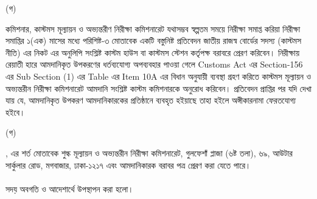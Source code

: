 \documentclass[12pt]{article}
\begin{document}
\begin{minipage}[t]{0.05\linewidth}
\hspace{1em}
\end{minipage}
\begin{minipage}[t]{0.05\linewidth}
(গ)
\end{minipage}
\begin{minipage}[t]{0.90\linewidth}
কমিশনার, কাস্টমস মূল্যায়ন ও অভ্যন্তরীণ
নিরীক্ষা কমিশনারেট যথাসম্ভব স্বল্পতম সময়ে
নিরীক্ষা সমাপ্ত করিয়া নিরীক্ষা সমাপ্তির
১(এক) মাসের মধ্যে পরিশিষ্ট-৩ মোতাবেক একটি
বস্তুনিষ্ট প্রতিবেদন জাতীয় রাজস্ব বোর্ডের
সদস্য (কাস্টমস নীতি) এর নিকট এর অনুলিপি সংশ্লিষ্ট
কাস্টম হাউস বা কাস্টমস স্টেশন কর্তৃপক্ষ
বরাবরে প্রেরণ করিবেন।
নিরীক্ষায় রেয়াতী হারে আমদানিকৃত উপকরণের
ধর্তব্যযোগ্য অপব্যবহার পাওয়া গেলে
Customs Act এর Section-156
এর Sub Section (1) এর Table এর Item 10A
এর বিধান অনুযায়ী ব্যবস্থা গ্রহণ করিতে কাস্টমস
মূল্যায়ন ও অভ্যন্তরীন নিরীক্ষা কমিশনারেট আমদানি
সংশ্লিষ্ট কাস্টম কমিশনারকে অনুরোধ করিবেন।
প্রতিবেদন প্রাপ্তির পর যদি দেখা যায় যে, আমদানিকৃত
উপকরণ আমদানিকারকের প্রতিষ্ঠানে ব্যবহৃত হইয়াছে তাহা
হইলে অঙ্গীকারনামা ফেরতযোগ্য হইবে।
\\
\end{minipage}
\begin{minipage}[t]{0.05\linewidth}
\hspace{1em}
\end{minipage}
\begin{minipage}[t]{0.05\linewidth}
(গ)
\end{minipage}
\begin{minipage}[t]{0.90\linewidth}
{\srootz}, {\srootzd} এর শর্ত মোতাবেক
শুল্ক মূল্যায়ন ও অভ্যন্তরীন নিরীক্ষা কমিশনারেট,
গুলফেশাঁ প্লাজা (৬ষ্ট তলা), ৬৯, আউটার
সার্কুলার রোড, মগবাজার, ঢাকা-১২১৭ এবং
আমদানিকারক বরাবর পত্র প্রেরণ করা যেতে পারে।
\\
\\
সদয় অবগতি ও আদেশার্থে উপস্থাপন করা
হলো।
\end{minipage}
\end{document}
